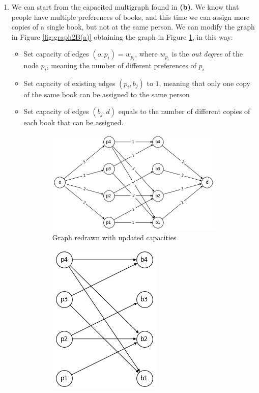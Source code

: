 \documentclass[
	12pt, %
]{fphw}
\begin{document}
\begin{enumerate}[{\bfseries (a)}]
    \item We can start from the capacited multigraph found in \textbf{(b)}. 
    We know that people have multiple preferences of books, and this time we can assign more copies of a single book, but not at the same person.
    We can modify the graph in Figure \ref{fig:graph2B(a)} obtaining the graph in Figure \ref{fig:graph2C(a)}, in this way:
    \begin{itemize}
        \item Set capacity of edges $(o, p_i) = w_{p_i}$, where $w_{p_i}$ is the \emph{out degree} of the node $p_i$, meaning the number of different preferences of $p_i$
        \item Set capacity of existing edges $(p_i, b_j)$ to $1$, meaning that only one copy of the same book can be assigned to the same person
        \item Set capacity of edges $(b_j, d)$ equals to the number of different copies of each book that can be assigned.
    \end{itemize}
    \begin{figure}[H]
    \centering
        \begin{subfigure}{.5\textwidth}
            \centering
            \includegraphics[width=1\linewidth]{2C(a).png}
            \caption{Graph redrawn with updated capacities}
            \label{fig:graph2C(a)}
        \end{subfigure}%
        \begin{subfigure}{.5\textwidth}
            \centering
            \includegraphics[width=0.5\linewidth]{2C(b).png}

\end{subfigure}
\end{figure}
\end{enumerate}
\end{document}
